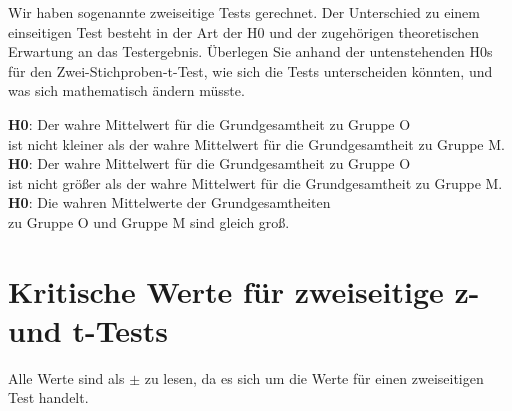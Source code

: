 Wir haben sogenannte zweiseitige Tests gerechnet.
Der Unterschied zu einem einseitigen Test besteht in der Art der H0 und der zugehörigen theoretischen Erwartung an das Testergebnis.
Überlegen Sie anhand der untenstehenden H0s für den Zwei-Stichproben-t-Test, wie sich die Tests unterscheiden könnten, und was sich mathematisch ändern müsste.

\begin{center}
  \textbf{H0}: Der wahre Mittelwert für die Grundgesamtheit zu Gruppe O\\
  ist nicht kleiner als der wahre Mittelwert für die Grundgesamtheit zu Gruppe M.\\
  \Zeile
  \textbf{H0}: Der wahre Mittelwert für die Grundgesamtheit zu Gruppe O\\
  ist nicht größer als der wahre Mittelwert für die Grundgesamtheit zu Gruppe M.\\
  \Zeile
  \textbf{H0}: Die wahren Mittelwerte der Grundgesamtheiten\\
  zu Gruppe O und Gruppe M sind gleich groß.
\end{center}

\newpage

\section*{Kritische Werte für zweiseitige z- und t-Tests}

Alle Werte sind als $\pm$ zu lesen, da es sich um die Werte für einen zweiseitigen Test handelt.\\

\Zeile

